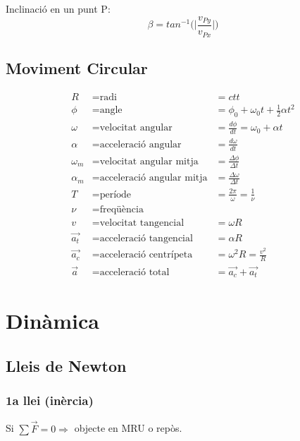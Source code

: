 Inclinació en un punt P:
\begin{equation}\label{eqi:Inclinacio tir parabolic}
    \beta = tan^{-1}\bigg(\bigg|\frac{v_{Py}}{v_{Px}}\bigg|\bigg)
\end{equation}

\subsection{Moviment Circular}
\begin{align*}
    R &= \text{radi} &= ctt \\
    \phi &= \text{angle} &= \phi_0 + \omega_0 t + \frac{1}{2} \alpha t^2 \\
    \omega &= \text{velocitat angular} &= \frac{d\phi}{dt} =  \omega_0 + \alpha t \\
    \alpha &= \text{acceleració angular} &= \frac{d\omega}{dt} \\
    \omega_m &= \text{velocitat angular mitja} &= \frac{\Delta \phi}{\Delta t} \\
    \alpha_m &= \text{acceleració angular mitja} &= \frac{\Delta \omega}{\Delta t} \\
    T &= \text{període} &= \frac{2\pi}{\omega} = \frac{1}{\nu}\\
    \nu &= \text{freqüència} \\
    v &= \text{velocitat tangencial} &= \omega  R \\
    \vec{a_t} &= \text{acceleració tangencial} &= \alpha  R \\
    \vec{a_c} &= \text{acceleració centrípeta} &= \omega^2R = \frac{v^2}{R} \\
    \vec{a} &= \text{acceleració total} &= \vec{a_c} + \vec{a_t}
\end{align*}

\section{Dinàmica}
\label{sec:dinamica}

\subsection{Lleis de Newton}
\subsubsection{1a llei (inèrcia)}
\begin{center}
    Si $\sum \vec{F} = 0 \Rightarrow$ objecte en MRU o repòs.
\end{center}

